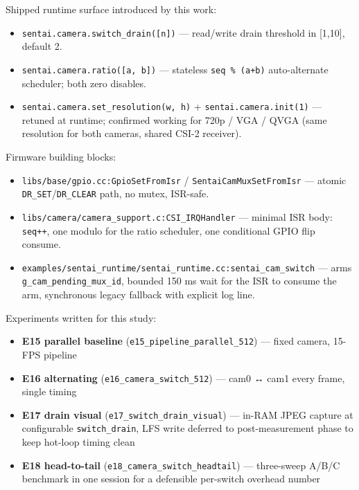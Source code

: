 Shipped runtime surface introduced by this work:

\begin{itemize}
\tightlist
\item
  \texttt{sentai.camera.switch\_drain({[}n{]})} --- read/write drain
  threshold in {[}1,10{]}, default 2.
\item
  \texttt{sentai.camera.ratio({[}a,\ b{]})} --- stateless
  \texttt{seq\ \%\ (a+b)} auto-alternate scheduler; both zero disables.
\item
  \texttt{sentai.camera.set\_resolution(w,\ h)} +
  \texttt{sentai.camera.init(1)} --- retuned at runtime; confirmed
  working for 720p / VGA / QVGA (same resolution for both cameras,
  shared CSI-2 receiver).
\end{itemize}

Firmware building blocks:

\begin{itemize}
\tightlist
\item
  \texttt{libs/base/gpio.cc:GpioSetFromIsr} /
  \texttt{SentaiCamMuxSetFromIsr} --- atomic
  \texttt{DR\_SET}/\texttt{DR\_CLEAR} path, no mutex, ISR-safe.
\item
  \texttt{libs/camera/camera\_support.c:CSI\_IRQHandler} --- minimal ISR
  body: \texttt{seq++}, one modulo for the ratio scheduler, one
  conditional GPIO flip consume.
\item
  \texttt{examples/sentai\_runtime/sentai\_runtime.cc:sentai\_cam\_switch}
  --- arms \texttt{g\_cam\_pending\_mux\_id}, bounded 150 ms wait for
  the ISR to consume the arm, synchronous legacy fallback with explicit
  log line.
\end{itemize}

Experiments written for this study:

\begin{itemize}
\tightlist
\item
  \textbf{E15 parallel baseline} (\texttt{e15\_pipeline\_parallel\_512})
  --- fixed camera, 15-FPS pipeline
\item
  \textbf{E16 alternating} (\texttt{e16\_camera\_switch\_512}) --- cam0
  ↔ cam1 every frame, single timing
\item
  \textbf{E17 drain visual} (\texttt{e17\_switch\_drain\_visual}) ---
  in-RAM JPEG capture at configurable \texttt{switch\_drain}, LFS write
  deferred to post-measurement phase to keep hot-loop timing clean
\item
  \textbf{E18 head-to-tail} (\texttt{e18\_camera\_switch\_headtail}) ---
  three-sweep A/B/C benchmark in one session for a defensible per-switch
  overhead number
\end{itemize}

